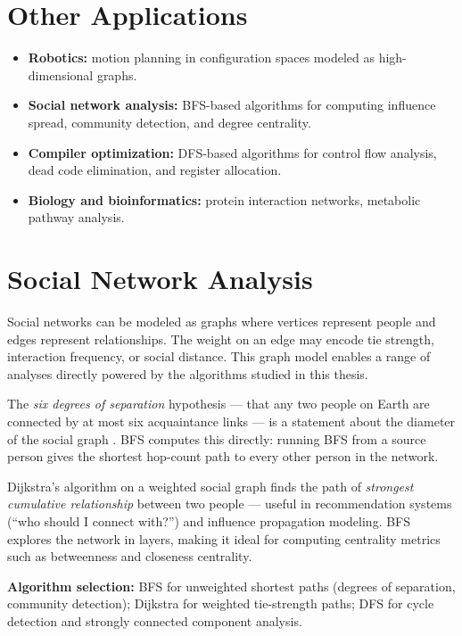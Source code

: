 \documentclass[12pt, a4paper, oneside]{report}
\theoremstyle{definition}
\begin{document}
\section{Other Applications}

\begin{itemize}
    \item \textbf{Robotics:} motion planning in configuration spaces modeled as high-dimensional graphs.
    \item \textbf{Social network analysis:} BFS-based algorithms for computing influence spread, community detection, and degree centrality.
    \item \textbf{Compiler optimization:} DFS-based algorithms for control flow analysis, dead code elimination, and register allocation.
    \item \textbf{Biology and bioinformatics:} protein interaction networks, metabolic pathway analysis.
\end{itemize}

\section{Social Network Analysis}

Social networks can be modeled as graphs where vertices represent people and edges represent relationships. The weight on an edge may encode tie strength, interaction frequency, or social distance. This graph model enables a range of analyses directly powered by the algorithms studied in this thesis.

The \emph{six degrees of separation} hypothesis — that any two people on Earth are connected by at most six acquaintance links — is a statement about the diameter of the social graph \citep{milgram1967}. BFS computes this directly: running BFS from a source person gives the shortest hop-count path to every other person in the network.

Dijkstra's algorithm on a weighted social graph finds the path of \emph{strongest cumulative relationship} between two people — useful in recommendation systems (``who should I connect with?'') and influence propagation modeling. BFS explores the network in layers, making it ideal for computing centrality metrics such as betweenness and closeness centrality.

\textbf{Algorithm selection:} BFS for unweighted shortest paths (degrees of separation, community detection); Dijkstra for weighted tie-strength paths; DFS for cycle detection and strongly connected component analysis.
\end{document}
